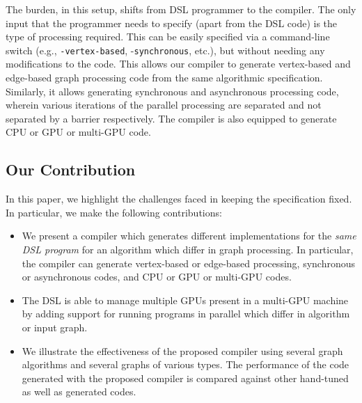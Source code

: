 \documentclass[12pt]{article}
\begin{document}
The burden, in this setup, shifts from DSL programmer to the compiler.
The only input that the programmer needs to specify (apart from the DSL code) is the type of processing required.
This can be easily specified via a command-line switch (e.g., \texttt{-vertex-based}, -\texttt{synchronous}, etc.), but without needing any modifications to the code.
This allows our compiler to generate vertex-based and edge-based graph processing code from the same algorithmic specification.
Similarly, it allows generating synchronous and asynchronous processing code, wherein various iterations of the parallel processing are separated and not separated by a barrier respectively. %
The compiler is also equipped to generate CPU or GPU or multi-GPU code.

\subsection{Our Contribution}

In this paper, we highlight the challenges faced in keeping the specification fixed.
In particular, we make the following contributions:
\begin{itemize}
\item We present a compiler which generates different implementations for the \textit{same DSL program} for an algorithm which differ in graph processing. In particular, the compiler can generate vertex-based or edge-based processing, synchronous or asynchronous codes, and CPU or GPU or multi-GPU codes.
\item The DSL is able to manage multiple GPUs present in a multi-GPU machine by adding support for running programs in parallel which differ in algorithm or input graph.
\item We illustrate the effectiveness of the proposed compiler using several graph algorithms and several graphs of various types. The performance of the code generated with the proposed compiler is compared against other hand-tuned as well as generated codes.
\end{itemize}


\end{document}
